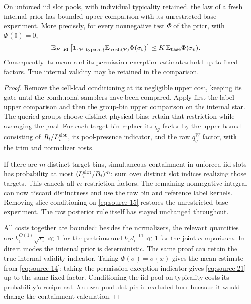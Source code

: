 \begin{lemma}\label{lem:fresh-internal-prior}
On unforced iid slot pools, with individual typicality retained, the law
of a fresh internal prior has bounded upper comparison with its
unrestricted base experiment. More precisely, for every nonnegative test
\(\Phi\) of the prior, with \(\Phi(0)=0\),
\[
 \mathbb E_{\mathcal P\ {\rm iid}}
  \left[\mathbf1_{\{\mathcal P\ {\rm typical}\}}
          \mathbb E_{\rm fresh(\mathcal P)}\Phi(\sigma_v)\right]
       \le K\,\mathbb E_{\rm base}\Phi(\sigma_v).
\]
Consequently its mean and its permission-exception estimates hold up to
fixed factors. True internal validity may be retained in the comparison.
\end{lemma}

\begin{proof}
Remove the cell-load conditioning at its negligible upper cost, keeping
its gate until the conditional samplers have been compared. Apply first
the label upper comparison and then the group-bin upper comparison on the
internal star. The queried groups choose distinct physical bins; retain
that restriction while averaging the pool. For each target bin replace
its \(\widetilde q_g\) factor by the upper bound consisting of
\(B_i/L_i^{\rm slot}\), its pool-presence indicator, and the raw
\(q_g^W\) factor, with the trim and normalizer costs.

If there are \(m\) distinct target bins, simultaneous containment in
unforced iid slots has probability at most
\((L_i^{\rm slot}/B_i)^m\): sum over distinct slot indices realizing
those targets. This cancels all \(m\) restriction factors. The remaining
nonnegative integral can now discard distinctness and use the raw bin and
reference label kernels. Removing slice conditioning on
\eqref{eq:source-15} restores the unrestricted base experiment. The raw
posterior rule itself has stayed unchanged throughout.

All costs together are bounded: besides the normalizers, the relevant
quantities are \(h_i^{O(1)}\sqrt{\epsilon_i}\ll1\) for the pretrims and
\(h_i d_i^{-.01}\ll1\) for the joint comparisons. In direct modes the
internal prior is deterministic. The same proof can retain the true
internal-validity indicator. Taking \(\Phi(\sigma)=\sigma(x)\) gives
the mean estimate from \eqref{eq:source-14}; taking the permission
exception indicator gives \eqref{eq:source-21} up to the same fixed
factor. Conditioning the iid pool on typicality costs its probability's
reciprocal. An own-pool slot pin is excluded here because it would change
the containment calculation.
\end{proof}
